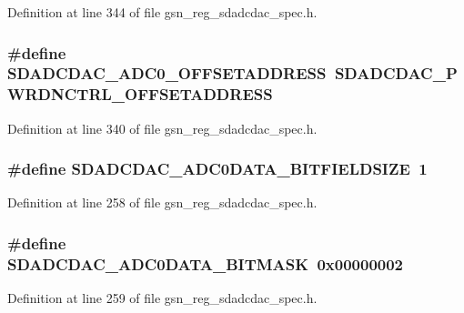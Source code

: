 Definition at line 344 of file gsn\_\-reg\_\-sdadcdac\_\-spec.h.

\hypertarget{a00569_a668923e5f581601124d6c9dfb4748d21}{
\subsubsection[{SDADCDAC\_\-ADC0\_\-OFFSETADDRESS}]{\setlength{\rightskip}{0pt plus 5cm}\#define SDADCDAC\_\-ADC0\_\-OFFSETADDRESS~SDADCDAC\_\-PWRDNCTRL\_\-OFFSETADDRESS}}
\label{a00569_a668923e5f581601124d6c9dfb4748d21}


Definition at line 340 of file gsn\_\-reg\_\-sdadcdac\_\-spec.h.

\hypertarget{a00569_a6b411a55793125ab314ce87ffbc5b8ee}{
\subsubsection[{SDADCDAC\_\-ADC0DATA\_\-BITFIELDSIZE}]{\setlength{\rightskip}{0pt plus 5cm}\#define SDADCDAC\_\-ADC0DATA\_\-BITFIELDSIZE~1}}
\label{a00569_a6b411a55793125ab314ce87ffbc5b8ee}


Definition at line 258 of file gsn\_\-reg\_\-sdadcdac\_\-spec.h.

\hypertarget{a00569_af4eb25f29e21b082308e4b049b529571}{
\subsubsection[{SDADCDAC\_\-ADC0DATA\_\-BITMASK}]{\setlength{\rightskip}{0pt plus 5cm}\#define SDADCDAC\_\-ADC0DATA\_\-BITMASK~0x00000002}}
\label{a00569_af4eb25f29e21b082308e4b049b529571}


Definition at line 259 of file gsn\_\-reg\_\-sdadcdac\_\-spec.h.

